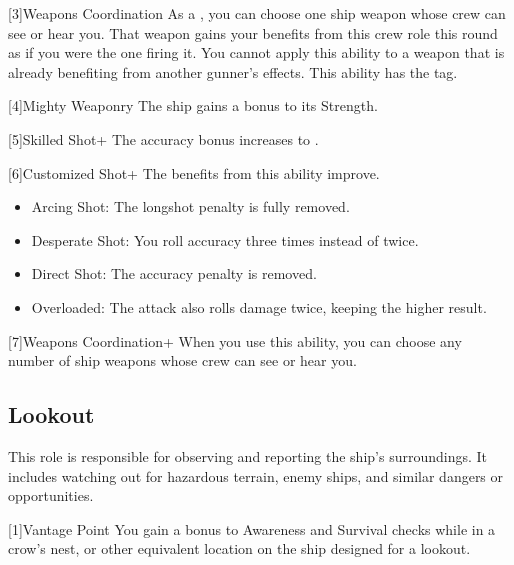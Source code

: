         [3]{Weapons Coordination} As a , you can choose one ship weapon whose crew can see or hear you.
        That weapon gains your benefits from this crew role this round as if you were the one firing it.
        You cannot apply this ability to a weapon that is already benefiting from another gunner's effects.
        This ability has the  tag.

        [4]{Mighty Weaponry} The ship gains a  bonus to its Strength.

        [5]{Skilled Shot+} The accuracy bonus increases to .

        [6]{Customized Shot+} The benefits from this ability improve.
        \begin{itemize}
            \item Arcing Shot: The longshot penalty is fully removed.
            \item Desperate Shot: You roll accuracy three times instead of twice.
            \item Direct Shot: The accuracy penalty is removed.
            \item Overloaded: The attack also rolls damage twice, keeping the higher result.
        \end{itemize}

        [7]{Weapons Coordination+} When you use this ability, you can choose any number of ship weapons whose crew can see or hear you.

    \subsection{Lookout}
        This role is responsible for observing and reporting the ship's surroundings.
        It includes watching out for hazardous terrain, enemy ships, and similar dangers or opportunities.

        [1]{Vantage Point} You gain a  bonus to Awareness and Survival checks while in a crow's nest, or other equivalent location on the ship designed for a lookout.

